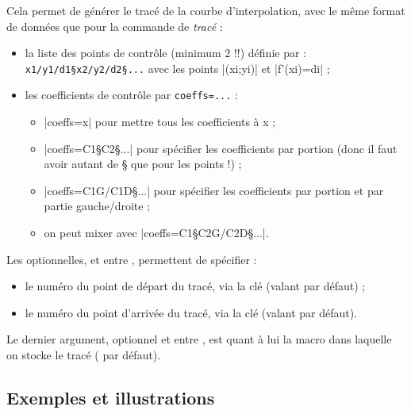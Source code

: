 \begin{cautionblock}
Cela permet de générer le tracé de la courbe d'interpolation, avec le même format de données que pour la commande de \textit{tracé} :

\begin{itemize}
	\item la liste des points de contrôle (minimum 2 !!)  définie par : \verb|x1/y1/d1§x2/y2/d2§...| avec les points \pverb|(xi;yi)| et \vverb|f'(xi)=di| ;
	\item les coefficients de contrôle par \verb|coeffs=...| :
	\begin{itemize}
		\item \averb|coeffs=x| pour mettre tous les coefficients à x ;
		\item \averb|coeffs=C1§C2§...| pour spécifier les coefficients par portion (donc il faut avoir autant de § que pour les points !) ;
		\item \averb|coeffs=C1G/C1D§...| pour spécifier les coefficients par portion et par partie gauche/droite ;
		\item on peut mixer avec \averb|coeffs=C1§C2G/C2D§...|.
	\end{itemize}
\end{itemize}

Les  optionnelles, et entre , permettent de spécifier :

\begin{itemize}
	\item le numéro du point de départ du tracé, via la clé  (valant  par défaut) ;
	\item le numéro du point d'arrivée du tracé, via la clé  (valant  par défaut).
\end{itemize}

Le dernier argument, optionnel et entre \Cle{[...]}, est quant à lui la macro dans laquelle on stocke le tracé ( par défaut).
\end{cautionblock}

\subsection{Exemples et illustrations}

\begin{PresCodePL}{}
\end{PresCodePL}

